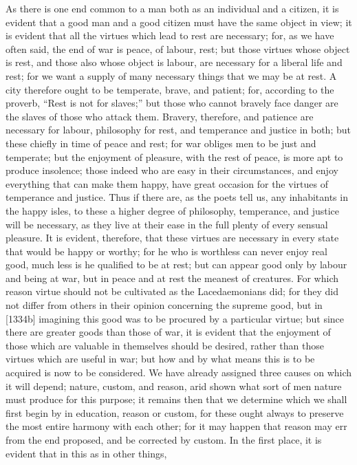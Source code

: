 As there is one end common to a man both as an individual and a citizen,
it is evident that a good man and a good citizen must have the same object
in view; it is evident that all the virtues which lead to rest are
necessary; for, as we have often said, the end of war is peace, of labour,
rest; but those virtues whose object is rest, and those also whose object
is labour, are necessary for a liberal life and rest; for we want a supply
of many necessary things that we may be at rest. A city therefore ought to
be temperate, brave, and patient; for, according to the proverb, ``Rest is
not for slaves;'' but those who cannot bravely face danger are the slaves
of those who attack them. Bravery, therefore, and patience are necessary
for labour, philosophy for rest, and temperance and justice in both; but
these chiefly in time of peace and rest; for war obliges men to be just
and temperate; but the enjoyment of pleasure, with the rest of peace, is
more apt to produce insolence; those indeed who are easy in their
circumstances, and enjoy everything that can make them happy, have great
occasion for the virtues of temperance and justice. Thus if there are, as
the poets tell us, any inhabitants in the happy isles, to these a higher
degree of philosophy, temperance, and justice will be necessary, as they
live at their ease in the full plenty of every sensual pleasure. It is
evident, therefore, that these virtues are necessary in every state that
would be happy or worthy; for he who is worthless can never enjoy real
good, much less is he qualified to be at rest; but can appear good only by
labour and being at war, but in peace and at rest the meanest of
creatures. For which reason virtue should not be cultivated as the
Lacedaemonians did; for they did not differ from others in their opinion
concerning the supreme good, but in [1334b] imagining this good was to be
procured by a particular virtue; but since there are greater goods than
those of war, it is evident that the enjoyment of those which are valuable
in themselves should be desired, rather than those virtues which are
useful in war; but how and by what means this is to be acquired is now to
be considered. We have already assigned three causes on which it will
depend; nature, custom, and reason, arid shown what sort of men nature
must produce for this purpose; it remains then that we determine which we
shall first begin by in education, reason or custom, for these ought
always to preserve the most entire harmony with each other; for it may
happen that reason may err from the end proposed, and be corrected by
custom. In the first place, it is evident that in this as in other things,
